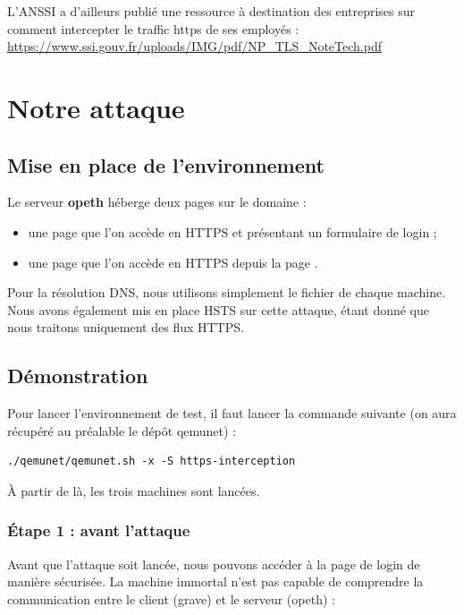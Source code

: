 L'ANSSI a d'ailleurs publié une ressource à destination des entreprises sur comment intercepter le traffic https de ses employés : \url{https://www.ssi.gouv.fr/uploads/IMG/pdf/NP_TLS_NoteTech.pdf}
\section{Notre attaque}

\subsection{Mise en place de l'environnement}

Le serveur \textbf{opeth} héberge deux pages sur le domaine  :

\begin{itemize}
\item une page  que l'on accède en HTTPS et présentant un formulaire de login ;
\item une page  que l'on accède en HTTPS depuis la page .
\end{itemize}

Pour la résolution DNS, nous utilisons simplement le fichier  de chaque machine. Nous avons également mis en place HSTS sur cette attaque, étant donné que nous traitons uniquement des flux HTTPS.

\subsection{Démonstration}

Pour lancer l'environnement de test, il faut lancer la commande suivante (on aura récupéré au préalable le dépôt qemunet) :

\begin{verbatim}
./qemunet/qemunet.sh -x -S https-interception
\end{verbatim}

À partir de là, les trois machines sont lancées.

\subsubsection{Étape 1 : avant l'attaque}

Avant que l'attaque soit lancée, nous pouvons accéder à la page de login de manière sécurisée. La machine immortal n'est pas capable de comprendre la communication entre le client (grave) et le serveur (opeth) :

